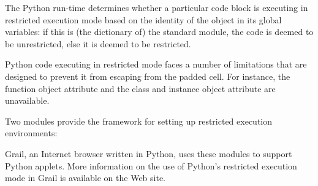 The Python run-time determines whether a particular code block is
executing in restricted execution mode based on the identity of the
 object in its global variables: if this is (the
dictionary of) the standard  module,
the code is deemed to be unrestricted, else it is deemed to be
restricted.

Python code executing in restricted mode faces a number of limitations
that are designed to prevent it from escaping from the padded cell.
For instance, the function object attribute  and
the class and instance object attribute  are
unavailable.

Two modules provide the framework for setting up restricted execution
environments:

\localmoduletable

\begin{seealso}
           {Grail, an Internet browser written in Python, uses these
            modules to support Python applets.  More
            information on the use of Python's restricted execution
            mode in Grail is available on the Web site.}
\end{seealso}
